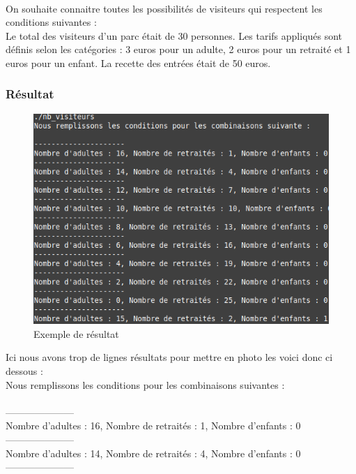 \documentclass[10pt,a4paper]{article}
\begin{document}
\paragraph{}
On souhaite connaitre toutes les possibilités de visiteurs qui respectent les conditions suivantes : \\
Le total des visiteurs d’un parc était de 30 personnes. Les tarifs appliqués sont
définis selon les catégories : 3 euros pour un adulte, 2 euros pour un retraité et 1 euros pour un enfant. La
recette des entrées était de 50 euros.
\subsubsection{Résultat}
\begin{figure}[h] 
\begin{center}
\includegraphics[scale=.3]{images/visit_ex_1}
\end{center}
\caption{Exemple de résultat}
\end{figure}
Ici nous avons trop de lignes résultats pour mettre en photo les voici donc ci dessous : \\
Nous remplissons les conditions pour les combinaisons suivantes :\\
\\
---------------------\\
Nombre d'adultes : 16, Nombre de retraités : 1, Nombre d'enfants : 0\\
---------------------\\
Nombre d'adultes : 14, Nombre de retraités : 4, Nombre d'enfants : 0\\
---------------------\\
\end{document}
